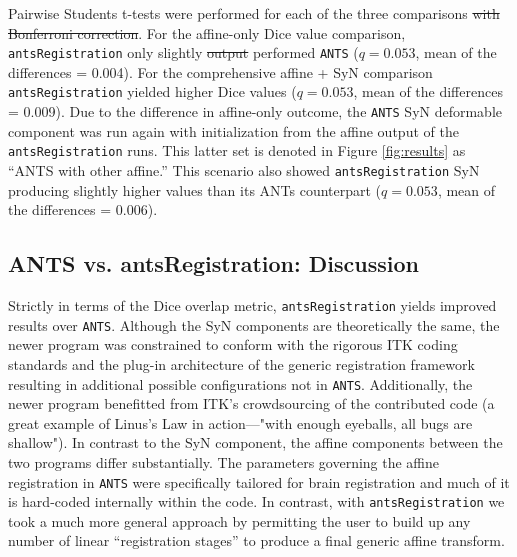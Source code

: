 \documentclass[final,5p,times,twocolumn]{elsarticle}
\newcommand{\trEdit}[1]{{\color{blue}{#1}}}
\newcommand{\trDelete}[1]{{\color{blue}\sout{#1}}}
\begin{document}
Pairwise Students t-tests \trEdit{with Bonferroni correction} were performed for each of the three
comparisons\trDelete{ with Bonferroni correction}.
For the affine-only Dice value comparison, \verb#antsRegistration# 
only slightly \trDelete{output} \trEdit{out}performed \verb#ANTS# ($q = 0.053$, mean of the 
differences = 0.004).  For the comprehensive affine + SyN comparison
\verb#antsRegistration# yielded higher Dice values ($q = 0.053$, 
mean of the differences = 0.009).
Due to the difference in affine-only outcome, the \verb#ANTS# 
SyN deformable component was run again with initialization from
the affine output of the \verb#antsRegistration# runs.  This
latter set is denoted in Figure \ref{fig:results} as ``ANTS with
other affine.''  This scenario also showed \verb#antsRegistration# SyN 
producing slightly higher values than its ANTs counterpart 
($q = 0.053$, mean of the differences = 0.006).



\subsection{ANTS vs. antsRegistration:  Discussion}
Strictly in terms of the Dice overlap metric, \verb#antsRegistration# yields
improved results over \verb#ANTS#.  Although the \trEdit{abstract algorithms implemented by the different} SyN \trEdit{software} components are theoretically
the same, \trEdit{implementation with} the newer program was constrained to conform
with the rigorous ITK coding standards and the plug-in architecture of
the generic registration framework resulting in additional possible
configurations not in \verb#ANTS#. Additionally, the newer program benefitted
from ITK's crowdsourcing of the contributed code (a great example of Linus's Law
in action---"with enough eyeballs, all bugs are shallow").  In contrast to the
SyN component, the affine components between the two programs differ substantially.
The parameters governing the affine registration in \verb#ANTS# were specifically 
tailored for brain registration and much of it is hard-coded internally within the
code.  In contrast, with \verb#antsRegistration# we took a much more general approach
by permitting the user to build up any number of linear ``registration stages'' 
to produce a final generic affine transform.
\end{document}
